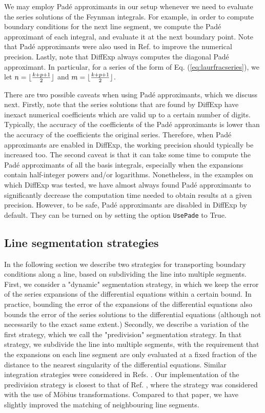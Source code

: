 \documentclass{article}
\DeclarePairedDelimiter{\floor}{\lfloor}{\rfloor}
\begin{document}
We may employ Padé approximants in our setup whenever we need to evaluate the series solutions of the Feynman integrals. For example, in order to compute boundary conditions for the next line segment, we compute the Padé approximant of each integral, and evaluate it at the next boundary point. Note that Padé approximants were also used in Ref. \cite{Frellesvig:2019byn} to improve the numerical precision. Lastly, note that DiffExp always computes the diagonal Padé approximant. In particular, for a series of the form of Eq. (\ref{eq:laurfracseries}), we let $n=\floor{\frac{k+p+1}{2}}$ and $m = \floor{\frac{k+p+1}{2}}$.

There are two possible caveats when using Padé approximants, which we discuss next. Firstly, note that the series solutions that are found by DiffExp have inexact numerical coefficients which are valid up to a certain number of digits. Typically, the accuracy of the coefficients of the Padé approximants is lower than the accuracy of the coefficients the original series. Therefore, when Padé approximants are enabled in DiffExp, the working precision should typically be increased too. The second caveat is that it can take some time to compute the Padé approximants of all the basis integrals, especially when the expansions contain half-integer powers and/or logarithms. Nonetheless, in the examples on which DiffExp was tested, we have almost always found Padé approximants to significantly decrease the computation time needed to obtain results at a given precision. However, to be safe, Padé approximants are disabled in DiffExp by default. They can be turned on by setting the option \texttt{UsePade} to True. 

\subsection{Line segmentation strategies}
In the following section we describe two strategies for transporting boundary conditions along a line, based on subdividing the line into multiple segments. First, we consider a "dynamic" segmentation strategy, in which we keep the error of the series expansions of the differential equations within a certain bound. In practice, bounding the error of the expansions of the differential equations also bounds the error of the series solutions to the differential equations (although not necessarily to the exact same extent.) Secondly, we describe a variation of the first strategy, which we call the "predivision" segmentation strategy. In that strategy, we subdivide the line into multiple segments, with the requirement that the expansions on each line segment are only evaluated at a fixed fraction of the distance to the nearest singularity of the differential equations. Similar integration strategies were considered in Refs. \cite{Francesco:2019yqt, Bonciani:2019jyb, Frellesvig:2019byn, Abreu:2020jxa}. Our implementation of the predivision strategy is closest to that of Ref. \cite{Frellesvig:2019byn}, where the strategy was considered with the use of Möbius transformations. Compared to that paper, we have slightly improved the matching of neighbouring line segments.
\end{document}
